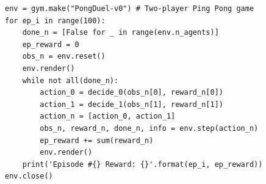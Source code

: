 \begin{code}
\begin{verbatim}
env = gym.make("PongDuel-v0") # Two-player Ping Pong game
for ep_i in range(100):
    done_n = [False for _ in range(env.n_agents)]
    ep_reward = 0
    obs_n = env.reset()
    env.render()
    while not all(done_n):
        action_0 = decide_0(obs_n[0], reward_n[0])
        action_1 = decide_1(obs_n[1], reward_n[1])
        action_n = [action_0, action_1]
        obs_n, reward_n, done_n, info = env.step(action_n)
        ep_reward += sum(reward_n)
        env.render()
    print('Episode #{} Reward: {}'.format(ep_i, ep_reward))
env.close()
\end{verbatim}
\label{code:two-agent-example}
\end{code}

